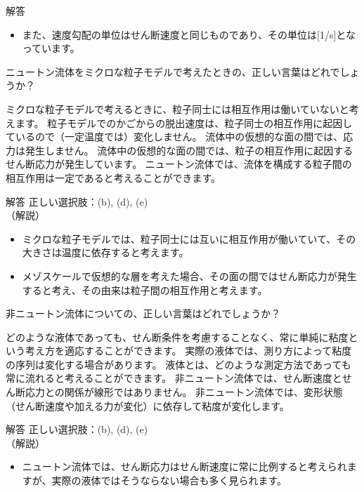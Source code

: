 \documentclass[uplatex,dvipdfmx,a4paper,11pt]{jsarticle}
\begin{document}
\begin{qlist}
\begin{itembox}[l]{解答}
\begin{itemize}
				\item また、速度勾配の単位はせん断速度と同じものであり、その単位は[1/s]となっています。
			\end{itemize}
        \end{itembox}
	\qitem ニュートン流体をミクロな粒子モデルで考えたときの、正しい言葉はどれでしょうか？
		\begin{qlist2}
			\qitem ミクロな粒子モデルで考えるときに、粒子同士には相互作用は働いていないと考えます。
			\qitem 粒子モデルでのかごからの脱出速度は、粒子同士の相互作用に起因しているので（一定温度では）変化しません。
			\qitem 流体中の仮想的な面の間では、応力は発生しません。
			\qitem 流体中の仮想的な面の間では、粒子の相互作用に起因するせん断応力が発生しています。
			\qitem ニュートン流体では、流体を構成する粒子間の相互作用は一定であると考えることができます。
		\end{qlist2}
		\vspace{3mm}
        \begin{itembox}[l]{解答}
            正しい選択肢：(b), (d), (e)\\
            （解説）
			\begin{itemize}
				\item ミクロな粒子モデルでは、粒子同士には互いに相互作用が働いていて、その大きさは温度に依存すると考えます。
				\item メゾスケールで仮想的な層を考えた場合、その面の間ではせん断応力が発生すると考え、その由来は粒子間の相互作用と考えます。
			\end{itemize}
        \end{itembox}
	\qitem 非ニュートン流体についての、正しい言葉はどれでしょうか？
		\begin{qlist2}
			\qitem どのような液体であっても、せん断条件を考慮することなく、常に単純に粘度という考え方を適応することができます。
			\qitem 実際の液体では、測り方によって粘度の序列は変化する場合があります。
			\qitem 液体とは、どのような測定方法であっても常に流れると考えることができます。
			\qitem 非ニュートン流体では、せん断速度とせん断応力との関係が線形ではありません。
			\qitem 非ニュートン流体では、変形状態（せん断速度や加える力が変化）に依存して粘度が変化します。
		\end{qlist2}
		\vspace{3mm}
        \begin{itembox}[l]{解答}
            正しい選択肢：(b), (d), (e)\\
            （解説）
			\begin{itemize}
				\item ニュートン流体では、せん断応力はせん断速度に常に比例すると考えられますが、実際の液体ではそうならない場合も多く見られます。

\end{itemize}
\end{itembox}
\end{qlist}
\end{document}
